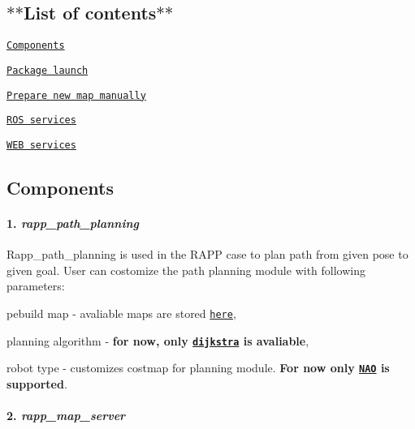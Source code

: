  \subsection*{$\ast$$\ast$\-List of contents$\ast$$\ast$ }


\begin{DoxyEnumerate}
\item \href{https://github.com/rapp-project/rapp-platform/wiki/#components}{\tt Components}
\item \href{https://github.com/rapp-project/rapp-platform/wiki/#package-launch}{\tt Package launch}
\item \href{https://github.com/rapp-project/rapp-platform/wiki/#prepare-new-map-manually}{\tt Prepare new map manually}
\item \href{https://github.com/rapp-project/rapp-platform/wiki/#ros-services}{\tt R\-O\-S services}
\item \href{https://github.com/rapp-project/rapp-platform/wiki/#web-services}{\tt W\-E\-B services}
\end{DoxyEnumerate}

\subsection*{Components}

\paragraph*{1. {\itshape rapp\-\_\-path\-\_\-planning}}

Rapp\-\_\-path\-\_\-planning is used in the R\-A\-P\-P case to plan path from given pose to given goal. User can costomize the path planning module with following parameters\-:
\begin{DoxyItemize}
\item pebuild map -\/ avaliable maps are stored \href{https://github.com/rapp-project/rapp-platform/tree/master/rapp_map_server/maps}{\tt here},
\item planning algorithm -\/ {\bfseries for now, only \href{https://en.wikipedia.org/wiki/Dijkstra%27s_algorithm}{\tt dijkstra} is avaliable},
\item robot type -\/ customizes costmap for planning module. {\bfseries For now only \href{https://www.aldebaran.com/en/humanoid-robot/nao-robot}{\tt N\-A\-O} is supported}.
\end{DoxyItemize}

\paragraph*{2. {\itshape rapp\-\_\-map\-\_\-server}}

